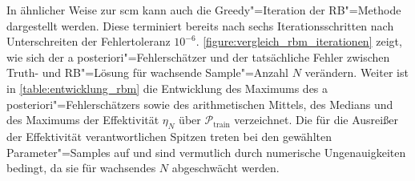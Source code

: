 \documentclass[../main.tex]{subfiles}
\begin{document}
In ähnlicher Weise zur \ac{scm} kann auch die Greedy"=Iteration der RB"=Methode dargestellt werden.
Diese terminiert bereits nach sechs Iterationsschritten nach Unterschreiten der Fehlertoleranz $10^{-6}$.
\cref{figure:vergleich_rbm_iterationen} zeigt, wie sich der a posteriori"=Fehlerschätzer und der tatsächliche Fehler zwischen Truth- und RB"=Lösung für wachsende Sample"=Anzahl $N$ verändern.
Weiter ist in \cref{table:entwicklung_rbm} die Entwicklung des Maximums des a posteriori"=Fehlerschätzers sowie des arithmetischen Mittels, des Medians und des Maximums der Effektivität $\eta_{N}$ über $\mathcal P_{\mathrm{train}}$ verzeichnet.
Die für die Ausreißer der Effektivität verantwortlichen Spitzen treten bei den gewählten Parameter"=Samples auf und sind vermutlich durch numerische Ungenauigkeiten bedingt, da sie für wachsendes $N$ abgeschwächt werden.
\end{document}
